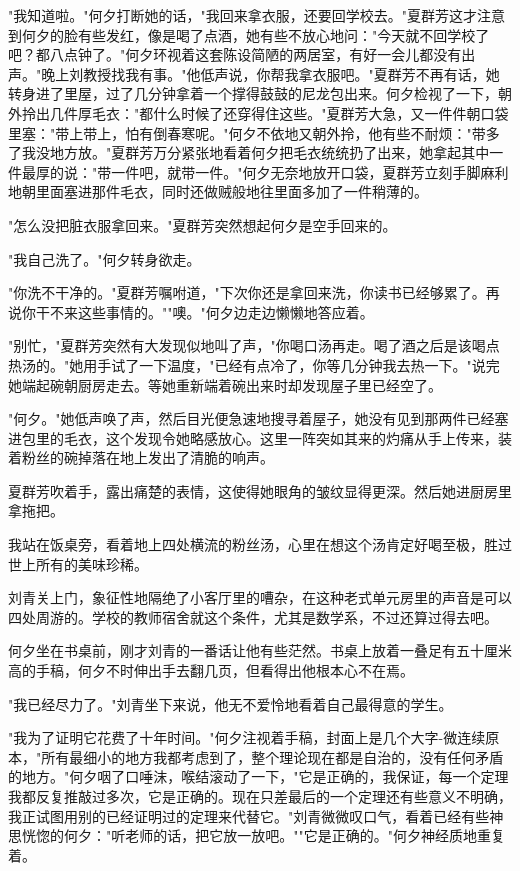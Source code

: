 \documentclass[UTF8]{ctexart}
\begin{document}
"我知道啦。"何夕打断她的话，"我回来拿衣服，还要回学校去。"夏群芳这才注意到何夕的脸有些发红，像是喝了点酒，她有些不放心地问："今天就不回学校了吧？都八点钟了。"何夕环视着这套陈设简陋的两居室，有好一会儿都没有出声。"晚上刘教授找我有事。"他低声说，你帮我拿衣服吧。"夏群芳不再有话，她转身进了里屋，过了几分钟拿着一个撑得鼓鼓的尼龙包出来。何夕检视了一下，朝外拎出几件厚毛衣："都什么时候了还穿得住这些。"夏群芳大急，又一件件朝口袋里塞："带上带上，怕有倒春寒呢。"何夕不依地又朝外拎，他有些不耐烦："带多了我没地方放。"夏群芳万分紧张地看着何夕把毛衣统统扔了出来，她拿起其中一件最厚的说："带一件吧，就带一件。"何夕无奈地放开口袋，夏群芳立刻手脚麻利地朝里面塞进那件毛衣，同时还做贼般地往里面多加了一件稍薄的。

"怎么没把脏衣服拿回来。"夏群芳突然想起何夕是空手回来的。

"我自己洗了。"何夕转身欲走。

"你洗不干净的。"夏群芳嘱咐道，"下次你还是拿回来洗，你读书已经够累了。再说你干不来这些事情的。""噢。"何夕边走边懒懒地答应着。

"别忙，"夏群芳突然有大发现似地叫了声，"你喝口汤再走。喝了酒之后是该喝点热汤的。"她用手试了一下温度，"已经有点冷了，你等几分钟我去热一下。"说完她端起碗朝厨房走去。等她重新端着碗出来时却发现屋子里已经空了。

"何夕。"她低声唤了声，然后目光便急速地搜寻着屋子，她没有见到那两件已经塞进包里的毛衣，这个发现令她略感放心。这里一阵突如其来的灼痛从手上传来，装着粉丝的碗掉落在地上发出了清脆的响声。

夏群芳吹着手，露出痛楚的表情，这使得她眼角的皱纹显得更深。然后她进厨房里拿拖把。

我站在饭桌旁，看着地上四处横流的粉丝汤，心里在想这个汤肯定好喝至极，胜过世上所有的美味珍稀。

刘青关上门，象征性地隔绝了小客厅里的嘈杂，在这种老式单元房里的声音是可以四处周游的。学校的教师宿舍就这个条件，尤其是数学系，不过还算过得去吧。

何夕坐在书桌前，刚才刘青的一番话让他有些茫然。书桌上放着一叠足有五十厘米高的手稿，何夕不时伸出手去翻几页，但看得出他根本心不在焉。

"我已经尽力了。"刘青坐下来说，他无不爱怜地看着自己最得意的学生。

"我为了证明它花费了十年时间。"何夕注视着手稿，封面上是几个大字-微连续原本，"所有最细小的地方我都考虑到了，整个理论现在都是自治的，没有任何矛盾的地方。"何夕咽了口唾沫，喉结滚动了一下，"它是正确的，我保证，每一个定理我都反复推敲过多次，它是正确的。现在只差最后的一个定理还有些意义不明确，我正试图用别的已经证明过的定理来代替它。"刘青微微叹口气，看着已经有些神思恍惚的何夕："听老师的话，把它放一放吧。""它是正确的。"何夕神经质地重复着。
\end{document}
